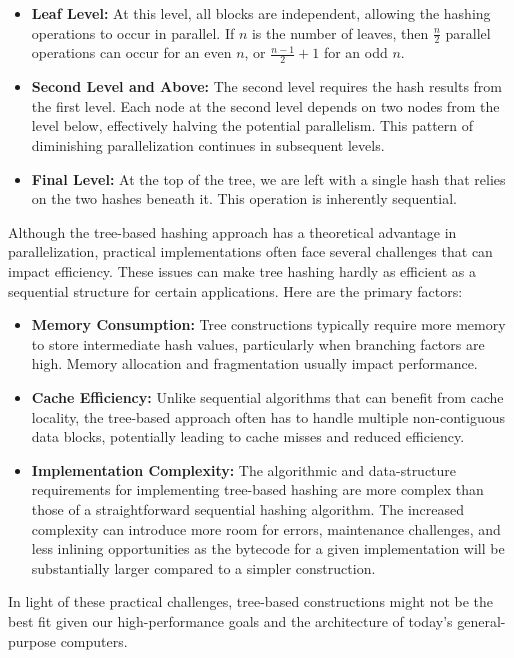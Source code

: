 \documentclass[10pt]{article}
\begin{document}
\begin{itemize}
\item \textbf{Leaf Level:} At this level, all blocks are independent, allowing the hashing operations to occur in parallel. If \( n \) is the number of leaves, then \( \frac{n}{2} \) parallel operations can occur for an even \( n \), or \( \frac{n-1}{2} + 1 \) for an odd \( n \).
\item \textbf{Second Level and Above:} The second level requires the hash results from the first level. Each node at the second level depends on two nodes from the level below, effectively halving the potential parallelism. This pattern of diminishing parallelization continues in subsequent levels.
\item \textbf{Final Level:} At the top of the tree, we are left with a single hash that relies on the two hashes beneath it. This operation is inherently sequential.
\end{itemize}

Although the tree-based hashing approach has a theoretical advantage in parallelization, practical implementations often face several challenges that can impact efficiency. These issues can make tree hashing hardly as efficient as a sequential structure for certain applications. Here are the primary factors:

\begin{itemize}
\item \textbf{Memory Consumption:} Tree constructions typically require more memory to store intermediate hash values, particularly when branching factors are high. Memory allocation and fragmentation usually impact performance.
\item \textbf{Cache Efficiency:} Unlike sequential algorithms that can benefit from cache locality, the tree-based approach often has to handle multiple non-contiguous data blocks, potentially leading to cache misses and reduced efficiency.
\item \textbf{Implementation Complexity:} The algorithmic and data-structure requirements for implementing tree-based hashing are more complex than those of a straightforward sequential hashing algorithm. The increased complexity can introduce more room for errors, maintenance challenges, and less inlining opportunities as the bytecode for a given implementation will be substantially larger compared to a simpler construction.
\end{itemize}

In light of these practical challenges, tree-based constructions might not be the best fit given our high-performance goals and the architecture of today's general-purpose computers.
\end{document}
